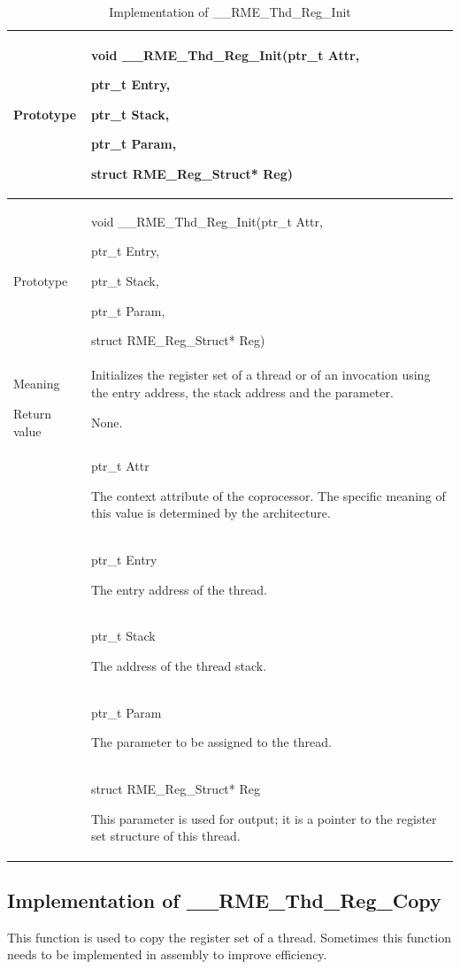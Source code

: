 \begin{xltabular}{\textwidth}{@{}>{\hsize\raggedright\arraybackslash}X>{\hsize\raggedright\arraybackslash}X@{}}
\caption{Implementation of \_\_RME\_Thd\_Reg\_Init}\label{tab:7-63-rme-thd-reg-init-implementation}\\
\toprule
Prototype\strut
 & void \_\_RME\_Thd\_Reg\_Init(ptr\_t Attr,

ptr\_t Entry,

ptr\_t Stack,

ptr\_t Param,

struct RME\_Reg\_Struct* Reg)\strut
\tabularnewline
\endfirsthead
\toprule
Prototype\strut
 & void \_\_RME\_Thd\_Reg\_Init(ptr\_t Attr,

ptr\_t Entry,

ptr\_t Stack,

ptr\_t Param,

struct RME\_Reg\_Struct* Reg)\strut
\tabularnewline
\midrule
\endhead
\bottomrule
\endlastfoot
Meaning &
Initializes the register set of a thread or of an invocation using the entry address, the stack address and the parameter.\tabularnewline
Return value & None.\tabularnewline
{} & ptr\_t Attr

The context attribute of the coprocessor. The specific meaning of this value is determined by the architecture.\strut
\tabularnewline
\strut
 & ptr\_t Entry

The entry address of the thread.\strut
\tabularnewline
\strut
 & ptr\_t Stack

The address of the thread stack.\strut
\tabularnewline
\strut
 & ptr\_t Param

The parameter to be assigned to the thread.\strut
\tabularnewline
\strut
 & struct RME\_Reg\_Struct* Reg

This parameter is used for output; it is a pointer to the register set structure of this thread.\strut
\tabularnewline
\end{xltabular}
\nopagebreak[4]

\subsection{Implementation of \_\_RME\_Thd\_Reg\_Copy}\label{subsec:7-rme-thd-reg-copy-implementation}

This function is used to copy the register set of a thread. Sometimes this function needs to be implemented in assembly to improve efficiency.

